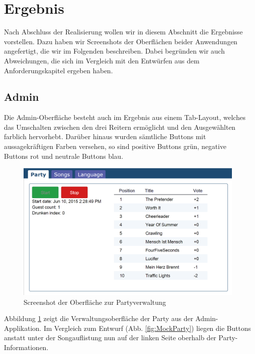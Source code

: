 \newpage
\section{Ergebnis}
Nach Abschluss der Realisierung wollen wir in diesem Abschnitt die Ergebnisse vorstellen. Dazu haben wir Screenshots der Oberflächen beider Anwendungen angefertigt, die wir im Folgenden beschreiben. Dabei begründen wir auch Abweichungen, die sich im Vergleich mit den Entwürfen aus dem Anforderungskapitel ergeben haben.

\subsection{Admin}
Die Admin-Oberfläche besteht auch im Ergebnis aus einem Tab-Layout, welches das Umschalten zwischen den drei Reitern ermöglicht und den Ausgewählten farblich hervorhebt. Darüber hinaus wurden sämtliche Buttons mit aussagekräftigen Farben versehen, so sind positive Buttons grün, negative Buttons rot und neutrale Buttons blau.

\begin{figure}[H]
\centering
\includegraphics[width=0.9\linewidth]{Bilder/Screenshot-Admin-Party}
\caption{Screenshot der Oberfläche zur Partyverwaltung}
\label{fig:Screenshot-Admin-Party}
\end{figure}

Abbildung \ref{fig:Screenshot-Admin-Party} zeigt die Verwaltungsoberfläche der Party aus der Admin-Applikation. Im Vergleich zum Entwurf (Abb. \ref{fig:MockParty}) liegen die Buttons anstatt unter der Songauflistung nun auf der linken Seite oberhalb der Party-Informationen.

